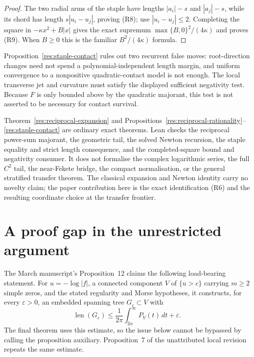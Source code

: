 \documentclass[11pt]{article}
\begin{document}
\begin{proof}
The two radial arms of the staple have lengths $|a_i|-s$ and $|a_j|-s$,
while its chord has length $s|u_i-u_j|$, proving (R8); use
$|u_i-u_j|\le2$.  Completing the square in
$-\kappa x^2+B|x|$ gives the exact supremum
$\max\{B,0\}^2/(4\kappa)$ and proves (R9).  When $B\ge0$ this is the familiar
$B^2/(4\kappa)$ formula.
\end{proof}

Proposition~\ref{res:staple-contact} rules out two recurrent false moves:
root-direction changes need not spend a polynomial-independent length margin,
and uniform convergence to a nonpositive quadratic-contact model is not
enough.  The local transverse jet and curvature must satisfy the displayed
sufficient negativity test.  Because $F$ is only bounded above by the
quadratic majorant, this test is not asserted to be necessary for contact
survival.

Theorem~\ref{res:reciprocal-expansion} and
Propositions~\ref{res:reciprocal-rationality}--\ref{res:staple-contact} are
ordinary exact theorems.  Lean checks the reciprocal power-sum majorant, the
geometric tail, the solved Newton recursion, the staple equality and strict
length consequence, and the completed-square bound and negativity consumer.
It does not formalise the complex logarithmic series, the full $C^2$ tail,
the near-Fekete bridge, the compact normalisation, or the general stratified
transfer theorem.  The classical expansion and Newton identity carry no
novelty claim; the paper contribution here is the exact identification (R6)
and the resulting coordinate choice at the transfer frontier.

\section{A proof gap in the unrestricted argument}\label{sec:gap}

The March manuscript's Proposition~12 claims the following load-bearing
statement.  For $u=-\log|f|$, a connected component $V$ of $\{u>c\}$ carrying
$m\ge2$ simple zeros, and the stated regularity and Morse hypotheses, it
constructs, for every $\varepsilon>0$, an embedded spanning tree
$G_\varepsilon\subset V$ with
\[
 \operatorname{len}(G_\varepsilon)
 \le\frac1{2\pi}\int_{2\alpha}^{\infty}P_V(t)\,dt+\varepsilon.
\tag{5.1}\label{eq:prop12-bound}
\]
The final theorem uses this estimate, so the issue below cannot be bypassed by
calling the proposition auxiliary.  Proposition~7 of the unattributed local
revision repeats the same estimate.
\end{document}
